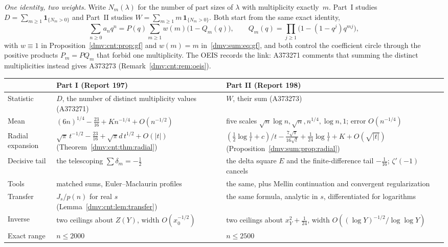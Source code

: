 \documentclass[11pt,letterpaper]{article}
\numberwithin{equation}{section}
\theoremstyle{definition}\newtheorem{definition}[theorem]{Definition}
\theoremstyle{remark}\newtheorem{remark}[theorem]{Remark}
\begin{document}
\emph{One identity, two weights.} Write $N_m(\lambda)$ for the number of part
sizes of $\lambda$ with multiplicity exactly~$m$. Part~I studies
$D=\sum_{m\ge1}\mathbf 1_{\{N_m>0\}}$ and Part~II studies
$W=\sum_{m\ge1}m\,\mathbf 1_{\{N_m>0\}}$. Both start from the same exact
identity,
\[
\sum_{n\ge0}a_nq^n=P(q)\sum_{m\ge1}w(m)\bigl(1-Q_m(q)\bigr),\qquad
Q_m(q)=\prod_{j\ge1}\bigl(1-(1-q^j)q^{mj}\bigr),
\]
with $w\equiv1$ in Proposition~\ref{dmv:cnt:prop:gf} and $w(m)=m$
in~\eqref{dmv:sum:eq:gf}, and both control the coefficient circle through
the positive products $P_m=PQ_m$ that forbid one multiplicity. The OEIS
records the link: A373271 comments that summing the distinct multiplicities
instead gives A373273 (Remark~\ref{dmv:cnt:rem:oeis}).
\begin{center}
\small
\begin{tabular}{@{}>{\raggedright\arraybackslash}p{}>{\raggedright\arraybackslash}p{}>{\raggedright\arraybackslash}p{}@{}}
\toprule
& Part I (Report 197) & Part II (Report 198)\\
\midrule
Statistic & $D$, the number of distinct multiplicity values (A373271) & $W$, their sum (A373273)\\
Mean & $(6n)^{1/4}-\tfrac{23}{16}+Kn^{-1/4}+O(n^{-1/2})$ & five scales $\sqrt n\log n,\sqrt n,n^{1/4},\log n,1$; error $O(n^{-1/4})$\\
Radial expansion & $\sqrt\pi\,t^{-1/2}-\tfrac{23}{16}+\sqrt\pi d\,t^{1/2}+O(|t|)$ (Theorem~\ref{dmv:cnt:thm:radial}) & $(\tfrac12\log\tfrac1t+c)/t-\tfrac{7\sqrt\pi}{16\sqrt t}+\tfrac1{24}\log\tfrac1t+K+O(\sqrt{|t|})$ (Proposition~\ref{dmv:sum:prop:radial})\\
Decisive tail & the telescoping $\sum\delta_m=-\tfrac12$ & the delta square $E$ and the finite-difference tail $-\tfrac1{16}$; $\zeta'(-1)$ cancels\\
Tools & matched sums, Euler--Maclaurin profiles & the same, plus Mellin continuation and convergent regularization\\
Transfer & $J_s/p(n)$ for real $s$ (Lemma~\ref{dmv:cnt:lem:transfer}) & the same formula, analytic in $s$, differentiated for logarithms\\
Inverse & two ceilings about $Z(Y)$, width $O(x_0^{-1/2})$ & two ceilings about $x_Y^2+\frac1{24}$, width $O((\log Y)^{-1/2}/\log\log Y)$\\
Exact range & $n\le2000$ & $n\le2500$\\
\bottomrule
\end{tabular}
\end{center}
\end{document}
